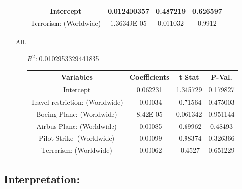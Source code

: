 \documentclass[12pt]{report}
\begin{document}
\begin{enumerate}
\begin{enumerate}
\begin{tabular}{|c|c|c|c|}
                    Intercept & 0.012400357 &  0.487219 &0.626597 \\  \hline
                    Terrorism: (Worldwide) & 1.36349E-05 & 0.011032 & 0.9912\\  \hline
                    \bottomrule
                \end{tabular}





        \end{enumerate}
    \item[\underline{All:}]
    \begin{samepage}

        \begin{enumerate}
            \item[$R^2$:]0.0102953329441835
            \item[]
                \begin{tabular}{|c|c|c|c|}
                    \toprule  \hline
                    \textbf{Variables} & \textbf{Coefficients} & \textbf{t Stat}&\textbf{P-Val.} \\  \hline

                    Intercept & 0.062231 &  1.345729 & 0.179827\\  \hline
                    Travel restriction: (Worldwide) & -0.00034 &  -0.71564 & 0.475003\\  \hline
                    Boeing Plane: (Worldwide) & 8.42E-05 &  0.061342 &0.951144\\  \hline
                    Airbus Plane: (Worldwide) & -0.00085 &  -0.69962 &0.48493 \\  \hline
                    Pilot Strike: (Worldwide) & -0.00099 &  -0.98374 &0.326366 \\  \hline
                    Terrorism: (Worldwide) & -0.00062 &  -0.4527 &0.651229 \\  \hline
                    \bottomrule
                \end{tabular}





        \end{enumerate}
        \end{samepage}
\end{enumerate}
\subsection*{Interpretation:}
\end{document}
